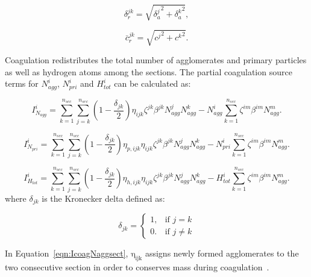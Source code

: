 \begin{equation}
 	\delta^{jk}_r=
	\sqrt{
		{\delta^j_a}^2+{\delta^k_a}^2
	}
 	\label{eqn:sqrtmeandist},
\end{equation}

\begin{equation}
	\bar{c}^{jk}_r=
	\sqrt{
		{c^j}^2+{c^k}^2
	}
	\label{eqn:sqrtmeanvel}.
\end{equation}

Coagulation redistributes the total number of agglomerates and primary particles as well as hydrogen atoms among the sections. The partial coagulation source terms for ${N^i_{agg}}$, ${N^i_{pri}}$ and ${H^i_{tot}}$ can be calculated as:

\begin{equation}
	I^i_{N_{agg}}
	=
	\sum_{k=1}^{n_{sec}}\sum_{j=k}^{n_{sec}}
	\left(
		1-\frac{\delta_{jk}}{2}
	\right)
	\eta_{ijk}\zeta^{jk}\beta^{jk}N^j_{agg}N^k_{agg}
	-
	N^i_{agg}
	\sum_{k=1}^{n_{sec}}\zeta^{im}\beta^{im}N^m_{agg}
	\label{eqn:IcoagNaggsect}.
\end{equation}

\begin{equation}
	I^i_{N_{pri}}
	=
	\sum_{k=1}^{n_{sec}}\sum_{j=k}^{n_{sec}}
	\left(
	1-\frac{\delta_{jk}}{2}
	\right)
	\eta_{p,ijk}\eta_{ijk}\zeta^{jk}\beta^{jk}N^j_{agg}N^k_{agg}
	-
	N^i_{pri}
	\sum_{k=1}^{n_{sec}}\zeta^{im}\beta^{im}N^m_{agg}
	\label{eqn:IcoagNprisect}.
\end{equation}

\begin{equation}
	I^i_{H_{tot}}
	=
	\sum_{k=1}^{n_{sec}}\sum_{j=k}^{n_{sec}}
	\left(
	1-\frac{\delta_{jk}}{2}
	\right)
	\eta_{h,ijk}\eta_{ijk}\zeta^{jk}\beta^{jk}N^j_{agg}N^k_{agg}
	-
	H^i_{tot}
	\sum_{k=1}^{n_{sec}}\zeta^{im}\beta^{im}N^m_{agg}
	\label{eqn:IcoagHtotsect}.
\end{equation}
\noindent where ${\delta_{jk}}$ is the Kronecker delta defined as:

\begin{equation}
	\delta_{jk}=
	\left\{
	\begin{array}{lr}
		1, & \text{if } j = k\\
		0. & \text{if } j \neq k
	\end{array}
	\right.
	\label{eqn:deltakronecker}
\end{equation}

In Equation~\eqref{eqn:IcoagNaggsect}, $\mathrm{\eta_{ijk}}$ assigns newly formed agglomerates to the two consecutive section in order to conserves mass during coagulation~\citep{park2005aerosol}.

